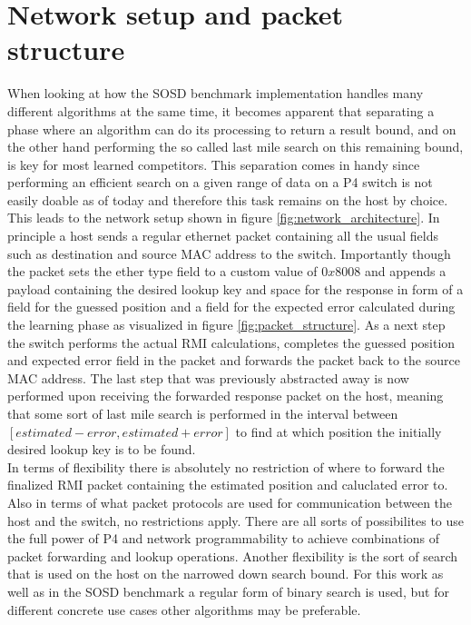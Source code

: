 \section{Network setup and packet structure}
\label{sect:rmionbmv2:network}
When looking at how the SOSD benchmark implementation handles many different algorithms at the same time, it becomes apparent that separating a phase where an algorithm can do its processing to return a result bound, and on the other hand performing the so called last mile search on this remaining bound, is key for most learned competitors. This separation comes in handy since performing an efficient search on a given range of data on a P4 switch is not easily doable as of today and therefore this task remains on the host by choice. This leads to the network setup shown in figure \ref{fig:network_architecture}. In principle a host sends a regular ethernet packet containing all the usual fields such as destination and source MAC address to the switch. Importantly though the packet sets the ether type field to a custom value of $0x8008$ and appends a payload containing the desired lookup key and space for the response in form of a field for the guessed position and a field for the expected error calculated during the learning phase as visualized in figure \ref{fig:packet_structure}. As a next step the switch performs the actual RMI calculations, completes the guessed position and expected error field in the packet and forwards the packet back to the source MAC address. The last step that was previously abstracted away is now performed upon receiving the forwarded response packet on the host, meaning that some sort of last mile search is performed in the interval between \([estimated - error, estimated + error]\) to find at which position the initially desired lookup key is to be found.\\

In terms of flexibility there is absolutely no restriction of where to forward the finalized RMI packet containing the estimated position and caluclated error to. Also in terms of what packet protocols are used for communication between the host and the switch, no restrictions apply. There are all sorts of possibilites to use the full power of P4 and network programmability to achieve combinations of packet forwarding and lookup operations. Another flexibility is the sort of search that is used on the host on the narrowed down search bound. For this work as well as in the SOSD benchmark a regular form of binary search is used, but for different concrete use cases other algorithms may be preferable.

